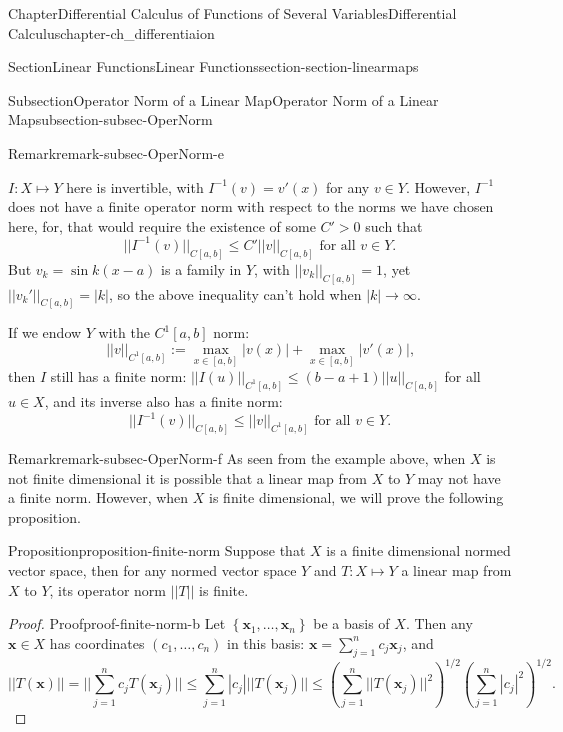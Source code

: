 \documentclass[oneside,10pt,]{book}
\numberwithin{equation}{section}
\begin{document}
\begin{chapterptx}{Chapter}{Differential Calculus of Functions of Several Variables}{}{Differential Calculus}{}{}{chapter-ch_differentiaion}
\begin{sectionptx}{Section}{Linear Functions}{}{Linear Functions}{}{}{section-section-linearmaps}
\begin{subsectionptx}{Subsection}{Operator Norm of a Linear Map}{}{Operator Norm of a Linear Map}{}{}{subsection-subsec-OperNorm}
\begin{remark}{Remark}{}{remark-subsec-OperNorm-e}
\par
\(I:X\mapsto Y\) here is invertible, with \(I^{-1}(v)=v'(x)\) for any \(v\in Y\). However, \(I^{-1}\) does not have a finite operator norm with respect to the norms we have chosen here, for, that would require the existence of some \(C'>0\) such that%
\begin{equation*}
||I^{-1}(v)||_{C[a, b]}\le C' ||v||_{C[a, b]} \text{ for all $v\in Y$.}
\end{equation*}
But \(v_{k}=\sin k(x-a)\)  is a family in \(Y\), with \(||v_{k}||_{C[a, b]}=1\), yet \(||v_{k}'||_{C[a, b]}=|k|\), so the above inequality can't hold when \(|k|\to \infty\).%
\par
If we endow \(Y\) with the \(C^{1}[a, b]\) norm:%
\begin{equation*}
||v||_{C^{1}[a, b]} :=\max_{x\in [a, b]} |v(x)| + \max_{x\in [a, b]} |v'(x)|\text{,}
\end{equation*}
then \(I\) still has a finite norm: \(||I(u)||_{C^{1}[a, b]}\le (b-a+1) ||u||_{C[a, b]}\) for all \(u\in X\), and its inverse also has a finite norm:%
\begin{equation*}
||I^{-1}(v)||_{C[a, b]} \le ||v||_{C^{1}[a, b]} \text{ for all $v\in Y$.}
\end{equation*}
%
\end{remark}
\begin{remark}{Remark}{}{remark-subsec-OperNorm-f}%
As seen from the example above, when \(X\) is not finite dimensional it is possible that a linear map from \(X\) to  \(Y\) may not have a finite norm. However, when \(X\) is  finite dimensional, we will prove the following proposition.\end{remark}
\begin{proposition}{Proposition}{}{}{proposition-finite-norm}%
Suppose that \(X\) is a finite dimensional normed vector space, then for any normed vector space \(Y\) and \(T: X\mapsto Y\) a linear map from \(X\) to  \(Y\), its operator norm \(||T||\) is finite.%
\end{proposition}
\begin{proof}{Proof}{}{proof-finite-norm-b}
Let \(\left\{{\mathbf x}_{1}, \ldots, {\mathbf x}_{n}\right\}\) be a basis of \(X\). Then any \({\mathbf x}\in X\) has coordinates \((c_{1}, \ldots, c_{n})\) in this basis: \({\mathbf x}=\sum_{j=1}^{n}c_{j} {\mathbf x}_{j}\), and%
\begin{equation*}
||T({\mathbf x})||=||\sum_{j=1}^{n}c_{j} T({\mathbf x}_{j})||\le 
\sum_{j=1}^{n}|c_{j}| || T({\mathbf x}_{j})|| \le 
\left( \sum_{j=1}^{n}|| T({\mathbf x}_{j})||^{2}\right)^{1/2} \left( \sum_{j=1}^{n}|c_{j}|^{2}\right)^{1/2}.

\end{equation*}
\end{proof}
\end{subsectionptx}
\end{sectionptx}
\end{chapterptx}
\end{document}
